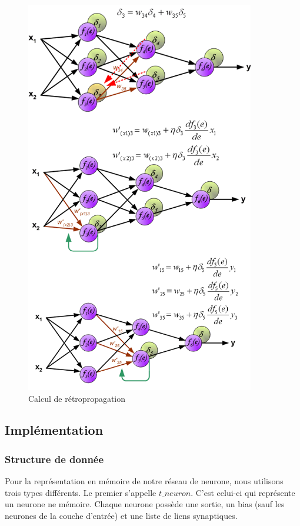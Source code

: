 \documentclass[11pt]{report}
\begin{document}
\begin{figure}[htbp]
\centering
\includegraphics[width=10cm]{retropropagation.png}
\caption{Calcul de rétropropagation}
\label{retropropagation}
\end{figure}

\subsection{Implémentation}

\subsubsection{Structure de donnée}

Pour la représentation en mémoire de notre réseau de neurone, nous utilisons trois types différents. Le premier s'appelle $t\_neuron$. C'est celui-ci qui représente un neurone ne mémoire. Chaque neurone possède une sortie, un bias (sauf les neurones de la couche d'entrée) et une liste de liens synaptiques.
\end{document}
